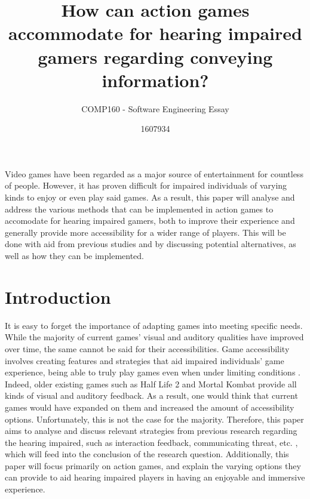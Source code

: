 \documentclass{scrartcl}
\title{How can action games accommodate for hearing impaired gamers regarding conveying information?}
\subtitle{COMP160 - Software Engineering Essay}
\author{1607934}
\begin{document}
\maketitle

\abstract
Video games have been regarded as a major source of entertainment for countless of people. However, it has proven difficult for impaired individuals of varying kinds to enjoy or even play said games. As a result, this paper will analyse and address the various methods that can be implemented in action games to accomodate for hearing impaired gamers, both to improve their experience and generally provide more accessibility for a wider range of players. This will be done with aid from previous studies and by discussing potential alternatives, as well as how they can be implemented.

\section{Introduction}
It is easy to forget the importance of adapting games into meeting specific needs. While the majority of current games' visual and auditory qualities have improved over time, the same cannot be said for their accessibilities. Game accessibility involves creating features and strategies that aid impaired individuals' game experience, being able to truly play games even when under limiting conditions \cite{11}. Indeed, older existing games such as Half Life 2 \cite{Denise} and Mortal Kombat provide all kinds of visual and auditory feedback. As a result, one would think that current games would have expanded on them and increased the amount of accessibility options. Unfortunately, this is not the case for the majority. Therefore, this paper aims to analyse and discuss relevant strategies from previous research regarding the hearing impaired, such as interaction feedback, communicating threat, etc. \cite{Denise}, which will feed into the conclusion of the research question. Additionally, this paper will focus primarily on action games, and explain the varying options they can provide to aid hearing impaired players in having an enjoyable and immersive experience.
\end{document}
